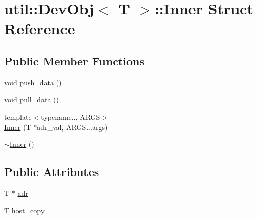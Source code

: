 \hypertarget{structutil_1_1DevObj_1_1Inner}{\section{util\-:\-:Dev\-Obj$<$ T $>$\-:\-:Inner Struct Reference}
\label{structutil_1_1DevObj_1_1Inner}
}
\subsection*{Public Member Functions}
\begin{DoxyCompactItemize}
\item 
void \hyperlink{structutil_1_1DevObj_1_1Inner_a24315cc84eabec14b342b12488b25f83}{push\-\_\-data} ()
\item 
void \hyperlink{structutil_1_1DevObj_1_1Inner_a412a005464bc8debea39661ad5cb069f}{pull\-\_\-data} ()
\item 
{\footnotesize template$<$typename... A\-R\-G\-S$>$ }\\\hyperlink{structutil_1_1DevObj_1_1Inner_ad43fbbbbe6c4e87ad6cfa0383a663bf3}{Inner} (T $\ast$adr\-\_\-val, A\-R\-G\-S...\-args)
\item 
\hyperlink{structutil_1_1DevObj_1_1Inner_a35423dc2cb2689dbd82dbdc974909ed8}{$\sim$\-Inner} ()
\end{DoxyCompactItemize}
\subsection*{Public Attributes}
\begin{DoxyCompactItemize}
\item 
T $\ast$ \hyperlink{structutil_1_1DevObj_1_1Inner_a93132ae135f7e3930cdde6b6a919dabe}{adr}
\item 
T \hyperlink{structutil_1_1DevObj_1_1Inner_aff47e5591c959e53f7d38e4ff728df17}{host\-\_\-copy}
\end{DoxyCompactItemize}



